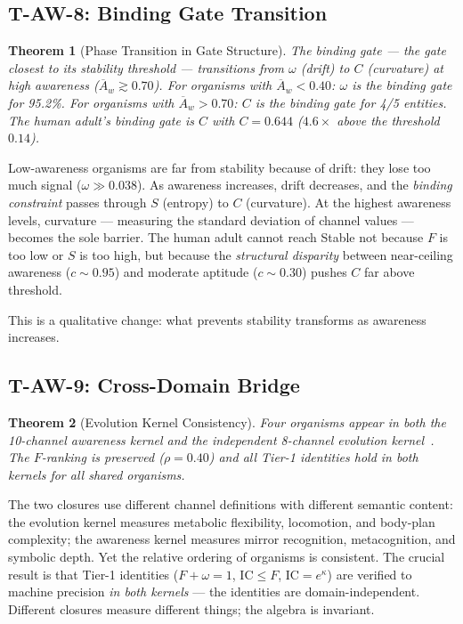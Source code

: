 \documentclass[
  aps,
  prd,
  twocolumn,
  superscriptaddress,
  nofootinbib,
  floatfix
]{revtex4-2}
\newtheorem{theorem}{Theorem}
\newcommand{\IC}{\mathrm{IC}}
\newcommand{\Aw}{\overline{A}_{\!w}}
\begin{document}
\subsection{T-AW-8: Binding Gate Transition}

\begin{theorem}[Phase Transition in Gate Structure]%
\label{thm:TAW8}
The binding gate --- the gate closest to its stability
threshold --- transitions from $\omega$ (drift) to $C$
(curvature) at high awareness ($\Aw \gtrsim 0.70$).  For
organisms with $\Aw < 0.40$: $\omega$ is the binding gate
for 95.2\%.  For organisms with $\Aw > 0.70$: $C$ is the
binding gate for 4/5 entities.  The human adult's binding
gate is $C$ with $C = 0.644$ ($4.6\times$ above the
threshold~$0.14$).
\end{theorem}

Low-awareness organisms are far from stability because of
drift: they lose too much signal ($\omega \gg 0.038$).
As awareness increases, drift decreases, and the
\emph{binding constraint} passes through $S$ (entropy) to
$C$ (curvature).  At the highest awareness levels, curvature
--- measuring the standard deviation of channel values ---
becomes the sole barrier.  The human adult cannot reach
Stable not because $F$ is too low or $S$ is too high, but
because the \emph{structural disparity} between near-ceiling
awareness ($c \sim 0.95$) and moderate aptitude ($c \sim 0.30$)
pushes $C$ far above threshold.

This is a qualitative change: what prevents stability
transforms as awareness increases.

\subsection{T-AW-9: Cross-Domain Bridge}

\begin{theorem}[Evolution Kernel Consistency]\label{thm:TAW9}
Four organisms appear in both the 10-channel awareness kernel
and the independent 8-channel evolution
kernel~\cite{paulus2025umcp}.  The $F$-ranking is preserved
($\rho = 0.40$) and all Tier-1 identities hold in both
kernels for all shared organisms.
\end{theorem}

The two closures use different channel definitions with
different semantic content: the evolution kernel measures
metabolic flexibility, locomotion, and body-plan complexity;
the awareness kernel measures mirror recognition, metacognition,
and symbolic depth.  Yet the relative ordering of organisms
is consistent.  The crucial result is that Tier-1 identities
($F + \omega = 1$, $\IC \leq F$, $\IC = e^\kappa$) are
verified to machine precision \emph{in both kernels} --- the
identities are domain-independent.  Different closures measure
different things; the algebra is invariant.
\end{document}
